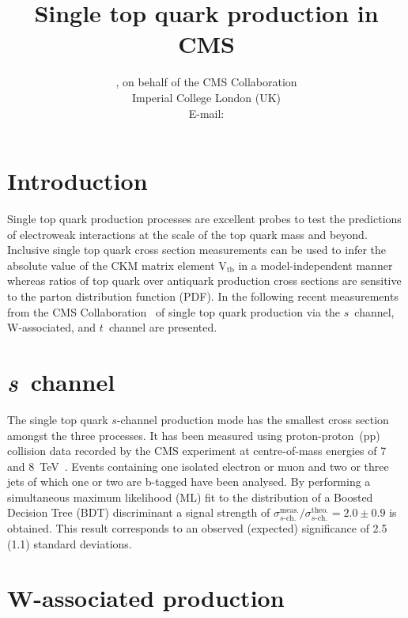 \documentclass{PoS}
\title{Single top quark production in CMS}
\author{
    \speaker{Matthias Komm}, on behalf of the CMS Collaboration\\
    Imperial College London (UK)\\
    E-mail: \email{Matthias.Komm@cern.ch}
}
\begin{document}
\section{Introduction}
Single top quark production processes are excellent probes to test the predictions of electroweak interactions at the scale of the top quark mass and beyond. Inclusive single top quark cross section measurements can be used to infer the absolute value of the CKM matrix element $\mathrm{V}_\mathrm{tb}$ in a model-independent manner whereas  ratios of top quark over antiquark production cross sections are sensitive to the parton distribution function (PDF). In the following recent measurements from the CMS Collaboration~\cite{cms} of single top quark production via the $s$~channel, W-associated, and $t$~channel are presented.

\section{\textit{s}~channel}

The single top quark $s$-channel production mode has the smallest cross section amongst the three processes. It has been measured using proton-proton~(pp) collision data recorded by the CMS experiment at centre-of-mass energies of 7 and 8~TeV~\cite{sch}. Events containing one isolated electron or muon and two or three jets of which one or two are b-tagged have been analysed. By performing a simultaneous maximum likelihood (ML) fit to the distribution of a Boosted Decision Tree (BDT) discriminant a signal strength of $\sigma^\mathrm{meas.}_{s\mbox{-}\mathrm{ch.}}/\sigma^\mathrm{theo.}_{s\mbox{-}\mathrm{ch.}}=2.0\pm0.9$ is obtained. This result corresponds to an observed (expected) significance of 2.5 (1.1) standard deviations.


\section{W-associated production}
\end{document}
